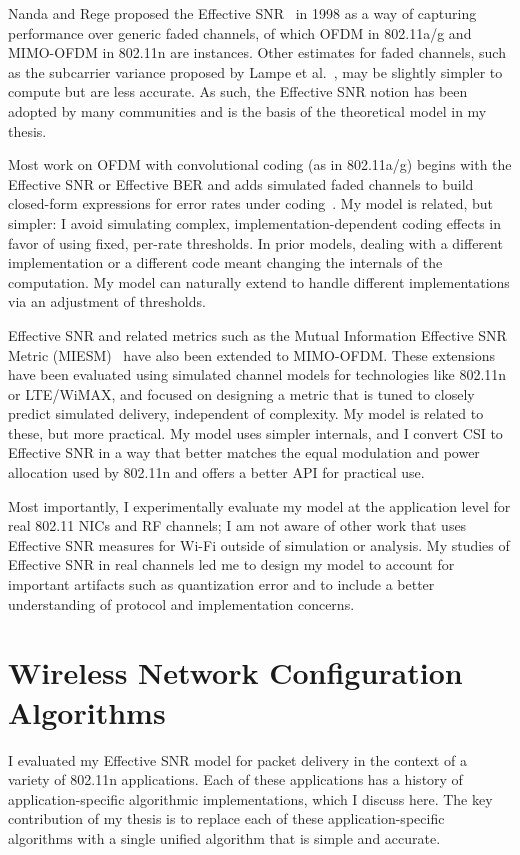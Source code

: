 Nanda and Rege proposed the Effective SNR~\cite{Nanda_EffectiveSNR} in 1998 as a way of capturing performance over generic faded channels, of which OFDM in 802.11a/g and MIMO-OFDM in 802.11n are instances. Other estimates for faded channels, such as the subcarrier variance proposed by Lampe et al.~\cite{Lampe_adaptation}, may be slightly simpler to compute but are less accurate. As such, the Effective SNR notion has been adopted by many communities and is the basis of the theoretical model in my thesis.

Most work on OFDM with convolutional coding (as in 802.11a/g) begins with the Effective SNR or Effective BER and adds simulated faded channels to build closed-form expressions for error rates under coding~\cite{Awoniyi_ofdm,Nortel_3g,Tralli_convolutional}. My model is related, but simpler: I avoid simulating complex, implementation-dependent coding effects in favor of using fixed, per-rate thresholds. In prior models, dealing with a different implementation or a different code meant changing the internals of the computation. My model can naturally extend to handle different implementations via an adjustment of thresholds.

Effective SNR and related metrics such as the Mutual Information Effective SNR Metric (MIESM)~\cite{He_MIESM,Liu_EESM,Kant_FLA,Jensen_FLA,Martorell_11n} have also been extended to MIMO-OFDM. These extensions have been evaluated using simulated channel models for technologies like 802.11n or LTE/WiMAX, and focused on designing a metric that is tuned to closely predict simulated delivery, independent of complexity. My model is related to these, but more practical. My model uses simpler internals, and I convert CSI to Effective SNR in a way that better matches the equal modulation and power allocation used by 802.11n and offers a better API for practical use.

Most importantly, I experimentally evaluate my model at the application level for real 802.11 NICs and RF channels; I am not aware of other work that uses Effective SNR measures for Wi-Fi outside of simulation or analysis. My studies of Effective SNR in real channels led me to design my model to account for important artifacts such as quantization error and to include a better understanding of protocol and implementation concerns.

\section{Wireless Network Configuration Algorithms}
I evaluated my Effective SNR model for packet delivery in the context of a variety of 802.11n applications. Each of these applications has a history of application-specific algorithmic implementations, which I discuss here. The key contribution of my thesis is to replace each of these application-specific algorithms with a single unified algorithm that is simple and accurate.

